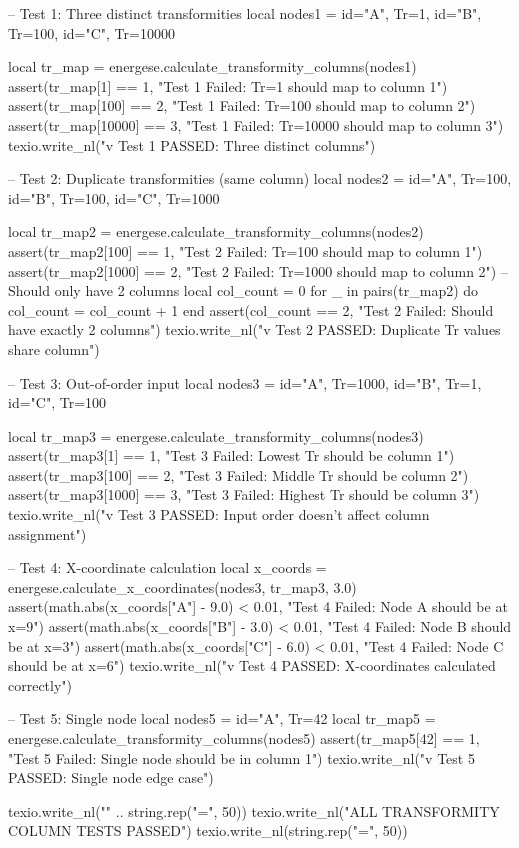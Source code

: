 \documentclass{article}
\begin{document}
\begin{luacode*}
    -- Test 1: Three distinct transformities
    local nodes1 = {
        {id="A", Tr=1},
        {id="B", Tr=100},
        {id="C", Tr=10000}
    }

    local tr_map = energese.calculate_transformity_columns(nodes1)
    assert(tr_map[1] == 1, "Test 1 Failed: Tr=1 should map to column 1")
    assert(tr_map[100] == 2, "Test 1 Failed: Tr=100 should map to column 2")
    assert(tr_map[10000] == 3, "Test 1 Failed: Tr=10000 should map to column 3")
    texio.write_nl("v Test 1 PASSED: Three distinct columns")

    -- Test 2: Duplicate transformities (same column)
    local nodes2 = {
        {id="A", Tr=100},
        {id="B", Tr=100},
        {id="C", Tr=1000}
    }

    local tr_map2 = energese.calculate_transformity_columns(nodes2)
    assert(tr_map2[100] == 1, "Test 2 Failed: Tr=100 should map to column 1")
    assert(tr_map2[1000] == 2, "Test 2 Failed: Tr=1000 should map to column 2")
    -- Should only have 2 columns
    local col_count = 0
    for _ in pairs(tr_map2) do col_count = col_count + 1 end
    assert(col_count == 2, "Test 2 Failed: Should have exactly 2 columns")
    texio.write_nl("v Test 2 PASSED: Duplicate Tr values share column")

    -- Test 3: Out-of-order input
    local nodes3 = {
        {id="A", Tr=1000},
        {id="B", Tr=1},
        {id="C", Tr=100}
    }

    local tr_map3 = energese.calculate_transformity_columns(nodes3)
    assert(tr_map3[1] == 1, "Test 3 Failed: Lowest Tr should be column 1")
    assert(tr_map3[100] == 2, "Test 3 Failed: Middle Tr should be column 2")
    assert(tr_map3[1000] == 3, "Test 3 Failed: Highest Tr should be column 3")
    texio.write_nl("v Test 3 PASSED: Input order doesn't affect column assignment")

    -- Test 4: X-coordinate calculation
    local x_coords = energese.calculate_x_coordinates(nodes3, tr_map3, 3.0)
    assert(math.abs(x_coords["A"] - 9.0) < 0.01, "Test 4 Failed: Node A should be at x=9")
    assert(math.abs(x_coords["B"] - 3.0) < 0.01, "Test 4 Failed: Node B should be at x=3")
    assert(math.abs(x_coords["C"] - 6.0) < 0.01, "Test 4 Failed: Node C should be at x=6")
    texio.write_nl("v Test 4 PASSED: X-coordinates calculated correctly")

    -- Test 5: Single node
    local nodes5 = {{id="A", Tr=42}}
    local tr_map5 = energese.calculate_transformity_columns(nodes5)
    assert(tr_map5[42] == 1, "Test 5 Failed: Single node should be in column 1")
    texio.write_nl("v Test 5 PASSED: Single node edge case")

    texio.write_nl("\n" .. string.rep("=", 50))
    texio.write_nl("ALL TRANSFORMITY COLUMN TESTS PASSED")
    texio.write_nl(string.rep("=", 50))
\end{luacode*}
\end{document}
